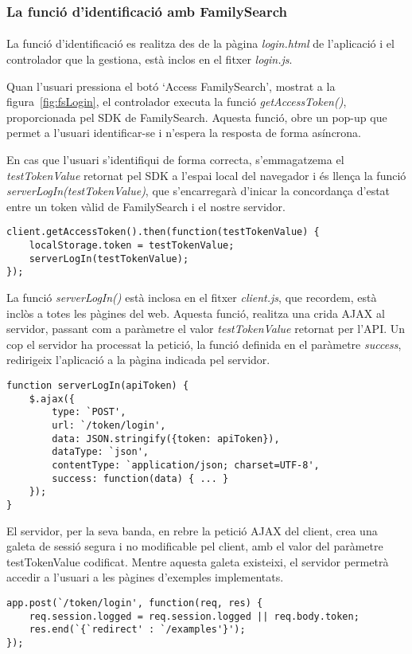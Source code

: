 \subsubsection{La funció d'identificació amb FamilySearch}

\paragraph{}
La funció d'identificació es realitza des de la pàgina \emph{login.html} de l'aplicació i el controlador que la gestiona, està inclos en el fitxer \emph{login.js}.

Quan l'usuari pressiona el botó `Access FamilySearch', mostrat a la figura~\ref{fig:fsLogin}, el controlador executa la funció \emph{getAccessToken()}, proporcionada pel SDK de FamilySearch. Aquesta funció, obre un pop-up que permet a l'usuari identificar-se i n'espera la resposta de forma asíncrona.

En cas que l'usuari s'identifiqui de forma correcta, s'emmagatzema el \emph{testTokenValue} retornat pel SDK a l'espai local del navegador i és llença la funció \emph{serverLogIn(testTokenValue)}, que s'encarregarà d'inicar la concordança d'estat entre un token vàlid de FamilySearch i el nostre servidor.

\begin{lstlisting}[style=rawOwn,caption={Petició al SDK de Javascript d'un token d'identificació}]
client.getAccessToken().then(function(testTokenValue) {
    localStorage.token = testTokenValue;
    serverLogIn(testTokenValue);
});
\end{lstlisting}

La funció \emph{serverLogIn()} està inclosa en el fitxer \emph{client.js}, que recordem, està inclòs a totes les pàgines del web. Aquesta funció, realitza una crida AJAX al servidor, passant com a paràmetre el valor \emph{testTokenValue} retornat per l'API. Un cop el servidor ha processat la petició, la funció definida en el paràmetre \emph{success}, redirigeix l'aplicació a la pàgina indicada pel servidor.

\begin{lstlisting}[style=rawOwn,caption={Crida AJAX al servidor amb el token retornat pel SDK}]
function serverLogIn(apiToken) {
    $.ajax({
        type: `POST',
        url: `/token/login',
        data: JSON.stringify({token: apiToken}),
        dataType: `json',
        contentType: `application/json; charset=UTF-8',
        success: function(data) { ... }
    });
}
\end{lstlisting}

El servidor, per la seva banda, en rebre la petició AJAX del client, crea una galeta de sessió segura i no modificable pel client, amb el valor del paràmetre testTokenValue codificat. Mentre aquesta galeta existeixi, el servidor permetrà accedir a l'usuari a les pàgines d'exemples implementats.

\begin{lstlisting}[style=rawOwn,caption={Petició POST d'identificació processada pel servidor}]
app.post(`/token/login', function(req, res) {
    req.session.logged = req.session.logged || req.body.token;
    res.end(`{`redirect' : `/examples'}');
});
\end{lstlisting}
